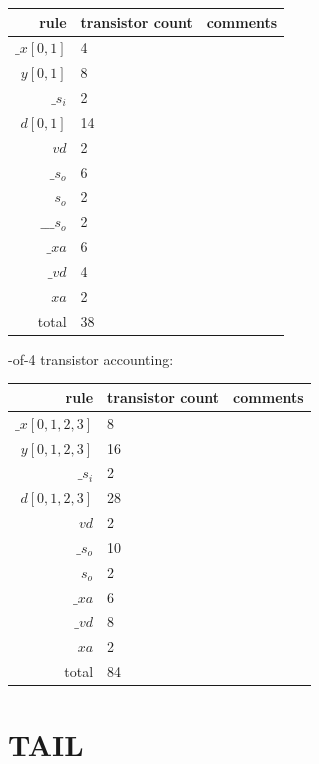 \documentclass{article}
\begin{document}
\begin{center}
    \begin{tabular}{|r|l|l|}
    \hline
    rule & transistor count & comments \\ \hline
    $\_x[0,1]$ & 4 & \\ \hline
    $y[0,1]$ & 8 & \\ \hline
    $\_s_i$ & 2 & \\ \hline
    $d[0,1]$ & 14 & \\ \hline
    $vd$ & 2 & \\ \hline
    $\_s_o$ & 6 & \\ \hline
    $s_o$ & 2 & \\ \hline
    $\_\_\_s_o$ & 2 & \\ \hline
    $\_xa$ & 6 & \\ \hline
    $\_vd$ & 4 & \\ \hline
    $xa$ & 2 & \\ \hline
    \hline total & 38 & \\ \hline
    \end{tabular}
\end{center}

-of-4 transistor accounting:

\begin{center}
    \begin{tabular}{|r|l|l|}
    \hline
    rule & transistor count & comments \\ \hline
    $\_x[0,1,2,3]$ & 8 & \\ \hline
    $y[0,1,2,3]$ & 16 & \\ \hline
    $\_s_i$ & 2 & \\ \hline
    $d[0,1,2,3]$ & 28 & \\ \hline
    $vd$ & 2 & \\ \hline
    $\_s_o$ & 10 & \\ \hline
    $s_o$ & 2 & \\ \hline
    $\_xa$ & 6 & \\ \hline
    $\_vd$ & 8 & \\ \hline
    $xa$ & 2 & \\ \hline
    \hline total & 84 & \\ \hline
    \end{tabular}
\end{center}

\section{TAIL \label{sec:DESERIAL_CHAIN_TAIL}}
\end{document}
